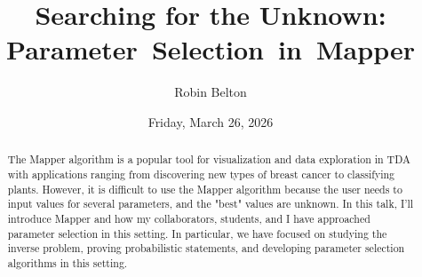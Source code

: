 \documentclass{UAmathtalk}
\author{Robin Belton}
\title{Searching for the Unknown: Parameter~Selection~in~Mapper}
\date{Friday, March 26, 2026}
\begin{document}
\maketitle

\begin{abstract}
The Mapper algorithm is a popular tool for visualization and data exploration in TDA with applications ranging from discovering new types of breast cancer to classifying plants. However, it is difficult to use the Mapper algorithm because the user needs to input values for several parameters, and the "best" values are unknown. In this talk, I'll introduce Mapper and how my collaborators, students, and I have approached parameter selection in this setting. In particular, we have focused on studying the inverse problem, proving probabilistic statements, and developing parameter selection algorithms in this setting.
\end{abstract}
\end{document}

